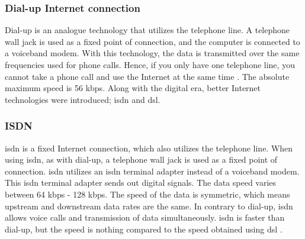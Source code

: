 \subsubsection{Dial-up Internet connection}
Dial-up is an analogue technology that utilizes the telephone line. A telephone wall jack is used as a fixed point of connection, and the computer is connected to a voiceband modem. With this technology, the data is transmitted over the same frequencies used for phone calls. Hence, if you only have one telephone line, you cannot take a phone call and use the Internet at the same time \cite{differentuplinks}. The absolute maximum speed is 56 \gls{kbps}. Along with the digital era, better Internet technologies were introduced; \gls{isdn} and \gls{dsl}. 

\subsubsection{ISDN}
\gls{isdn} is a fixed Internet connection, which also utilizes the telephone line. When using \gls{isdn}, as with dial-up, a telephone wall jack is used as a fixed point of connection. \gls{isdn} utilizes an \gls{isdn} terminal adapter instead of a voiceband modem. This \gls{isdn} terminal adapter sends out digital signals. The data speed varies between 64 \gls{kbps} - 128 \gls{kbps}. The speed of the data is symmetric, which means upstream and downstream data rates are the same. In contrary to dial-up, \gls{isdn} allows voice calls and transmission of data simultaneously. \gls{isdn} is faster than dial-up, but the speed is nothing compared to the speed obtained using \gls{dsl} \cite{differentuplinks}. 

